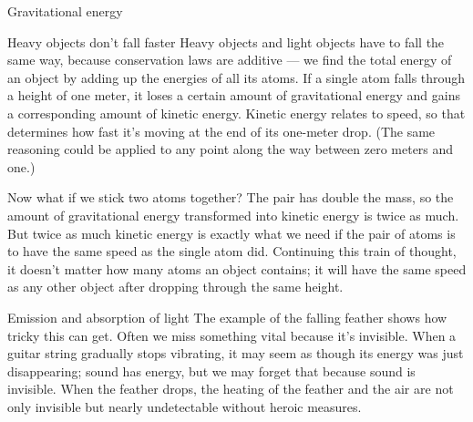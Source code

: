 \begin{envsubsection}{Gravitational energy}
\begin{eg}{Heavy objects don't fall faster}
Heavy objects and light objects have to fall the same way, because conservation
laws are additive --- we find the total energy of an object by adding up the energies
of all its atoms. If a single atom falls through a height of one meter, it loses a certain
amount of gravitational energy and gains a corresponding amount of kinetic energy.
Kinetic energy relates to speed, so that determines how fast it's moving at the end
of its one-meter drop. (The same reasoning could be applied to any point along the
way between zero meters and one.)

Now what if we stick two atoms together? The pair has double the mass, so the amount
of gravitational energy transformed into kinetic energy is twice as much. But twice
as much kinetic energy is exactly what we need if the pair of atoms is to have the same
speed as the single atom did. Continuing this train of thought, it doesn't matter how many
atoms an object contains; it will have the same speed as any other object after dropping
through the same height.
\end{eg}


\begin{envsubsection}{Emission and absorption of light}
The example of the falling feather shows how tricky this can get. Often we miss something
vital because it's invisible. When a guitar string gradually stops vibrating, it may seem as
though its energy was just disappearing; sound has energy, but we may forget that because
sound is invisible. When the feather drops, the heating of the feather and the air are not
only invisible but nearly undetectable without heroic
measures.


\end{envsubsection}
\end{envsubsection}
